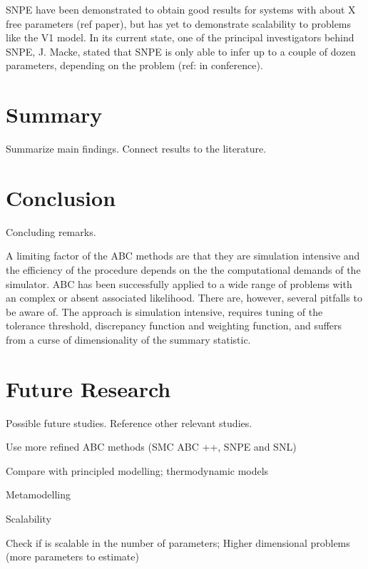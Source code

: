 SNPE have been demonstrated to obtain good results for systems with about X free parameters (ref paper), but has yet to demonstrate scalability to problems like the V1 model. In its current state, one of the principal investigators behind SNPE, J. Macke, stated that SNPE is only able to infer up to a couple of dozen parameters, depending on the problem (ref: in conference).


\section{Summary}\label{sec:summary}

Summarize main findings. Connect results to the literature. 

\section{Conclusion}\label{sec:conclusion}

Concluding remarks.

A limiting factor of the ABC methods are that they are simulation intensive and the efficiency of the procedure depends on the the computational demands of the simulator.  
ABC has been successfully applied to a wide range of problems with an complex or absent associated likelihood. There are, however, several pitfalls to be aware of. The approach is simulation intensive, requires tuning of the tolerance threshold, discrepancy function and weighting function, and suffers from a curse of dimensionality of the summary statistic.  

\section{Future Research}\label{sec:future}

Possible future studies. Reference other relevant studies. 

Use more refined ABC methods
(SMC ABC ++, SNPE and SNL)

Compare with principled modelling; thermodynamic models

Metamodelling

Scalability 

Check if is scalable in the number of parameters;
Higher dimensional problems (more parameters to estimate)

